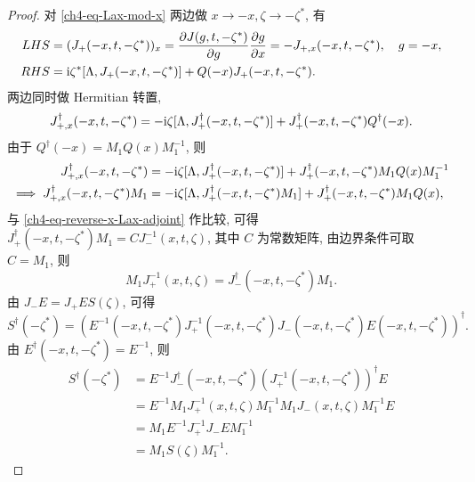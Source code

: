 \begin{proof}
    对 \eqref{ch4-eq-Lax-mod-x} 两边做 $ x \to -x, \zeta \to -\zeta^{*}$, 有
    \begin{equation}
        \begin{aligned}
            LHS & = (J_{+}(-x, t, -\zeta^{*}))_{x} = \frac{\partial J(g,t,-\zeta^{*})}{\partial g} \frac{\partial g}{\partial x} = -J_{+,x}(-x, t, -\zeta^{*}), \quad g = -x, \\
            RHS & = \mathrm{i} \zeta^{*} [\Lambda, J_{+}(-x,t,-\zeta^{*})] + Q(-x) J_{+}(-x,t,-\zeta^{*}).
        \end{aligned}
    \end{equation}
    两边同时做 Hermitian 转置,
    \begin{equation}
        J_{+,x}^{\dagger}(-x,t,-\zeta^{*}) = -\mathrm{i} \zeta [\Lambda, J_{+}^{\dagger}(-x, t, -\zeta^{*})] + J_{+}^{\dagger}(-x,t,-\zeta^{*}) Q^{\dagger}(-x).
    \end{equation}
    由于 $Q^{\dagger}(-x) = M_{1} Q(x) M_{1}^{-1}$, 则
    \begin{equation}
        \begin{aligned}
            J_{+,x}^{\dagger}(-x,t,-\zeta^{*})               & = -\mathrm{i} \zeta [\Lambda, J_{+}^{\dagger}(-x, t, -\zeta^{*})] + J_{+}^{\dagger}(-x,t,-\zeta^{*}) M_{1} Q(x) M_{1}^{-1} \\
            \implies J_{+,x}^{\dagger}(-x,t,-\zeta^{*})M_{1} & = -\mathrm{i} \zeta [\Lambda, J_{+}^{\dagger}(-x,t,-\zeta^{*})M_{1}] + J_{+}^{\dagger}(-x,t,-\zeta^{*}) M_{1} Q(x),
        \end{aligned}
    \end{equation}
    与 \eqref{ch4-eq-reverse-x-Lax-adjoint} 作比较, 可得 $J_{+}^{\dagger}(-x,t,-\zeta^{*}) M_{1} = C J_{-}^{-1}(x,t,\zeta)$, 其中 $C$ 为常数矩阵, 由边界条件可取 $C = M_{1}$, 则
    \begin{equation}
        M_{1} J_{+}^{-1}(x,t,\zeta) = J_{-}^{\dagger}(-x,t,-\zeta^{*}) M_{1}.
    \end{equation}
    由 $J_{-}E = J_{+} E S(\zeta)$, 可得
    \begin{equation}
        S^{\dagger}(-\zeta^{*}) = \left(E^{-1}(-x, t, -\zeta^{*}) J_{+}^{-1}(-x, t, -\zeta^{*}) J_{-}(-x, t, -\zeta^{*}) E(-x, t, -\zeta^{*})\right)^{\dagger}.
    \end{equation}
    由 $E^{\dagger}(-x, t, -\zeta^{*}) = E^{-1}$, 则
    \begin{equation}
        \begin{aligned}
            S^{\dagger}(-\zeta^{*}) & = E^{-1} J_{-}^{\dagger}(-x, t, -\zeta^{*}) (J_{+}^{-1}(-x, t, -\zeta^{*}))^{\dagger} E \\
                                    & = E^{-1} M_{1} J_{+}^{-1}(x,t,\zeta) M_{1}^{-1} M_{1} J_{-}(x,t,\zeta) M_{1}^{-1} E     \\
                                    & = M_{1} E^{-1} J_{+}^{-1} J_{-} E M_{1}^{-1}                                            \\
                                    & = M_{1} S(\zeta) M_{1}^{-1}.
        \end{aligned}
    \end{equation}
\end{proof}
